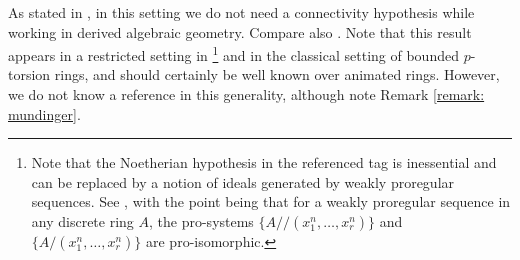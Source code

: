 \documentclass[10pt,reqno]{amsart}
\numberwithin{equation}{section}
\begin{document}
\begin{remark}\label{remark: mod on spf ref}
    As stated in \cite[Remark 8.3.4.5]{Lur18}, in this setting we do not need a connectivity hypothesis while working in derived algebraic geometry. Compare also \cite[Footnote 12]{BS19}. Note that this result appears in a restricted setting in \cite[\href{https:/\!\!/stacks.math.columbia.edu/tag/0H0L}{Tag 0H0L}]{stacks-project}\footnote{Note that the Noetherian hypothesis in the referenced tag is inessential and can be replaced by a notion of ideals generated by weakly proregular sequences. See \cite[\href{https:/\!\!/stacks.math.columbia.edu/tag/0H1E}{Tag 0H1E}]{stacks-project}, with the point being that for a weakly proregular sequence in any discrete ring $A$, the pro-systems $\{A/\!\!/(x_1^n,\ldots, x_r^n)\}$ and $\{A/(x^n_1,\ldots, x^n_r)\}$ are pro-isomorphic.} and \cite[Appendix A.]{AntieauKrauseNikolaus2023PrismaticDeltaRings} in the classical setting of bounded $p$-torsion rings, and should certainly be well known over animated rings. However, we do not know a reference in this generality, although note Remark \ref{remark: mundinger}.
    \end{remark}
\end{document}
